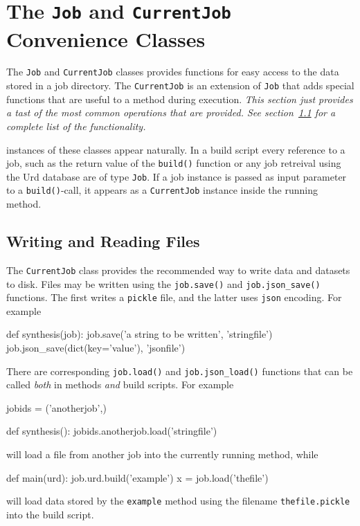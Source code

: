 \section{The \texttt{Job} and \texttt{CurrentJob} Convenience Classes}
The \texttt{Job} and \texttt{CurrentJob} classes provides functions
for easy access to the data stored in a job directory.  The
\texttt{CurrentJob} is an extension of \texttt{Job} that adds special
functions that are useful to a method during execution.  \textsl{This
  section just provides a tast of the most common operations that are
  provided.  See section~\ref{} for a complete list of the
  functionality.}

instances of these classes appear naturally.  In a build script every
reference to a job, such as the return value of the \texttt{build()}
function or any job retreival using the Urd database are of type
\texttt{Job}.  If a job instance is passed as input parameter to a
\texttt{build()}-call, it appears as a \texttt{CurrentJob} instance
inside the running method.


\subsection{Writing and Reading Files}
The \texttt{CurrentJob} class provides the recommended way to write
data and datasets to disk.  Files may be written using the
\texttt{job.save()} and \texttt{job.json\_save()} functions.  The
first writes a \texttt{pickle} file, and the latter uses \texttt{json}
encoding.  For example
\begin{python}
def synthesis(job):
   job.save('a string to be written', 'stringfile')
   job.json_save(dict(key='value'), 'jsonfile')
\end{python}
There are corresponding \texttt{job.load()} and
\texttt{job.json\_load()} functions that can be called \textsl{both}
in methods \textsl{and} build scripts.  For example
\begin{python}
jobids = ('anotherjob',)

def synthesis():
    jobids.anotherjob.load('stringfile')
\end{python}
will load a file from another job into the currently running method, while
\begin{python}
def main(urd):
    job.urd.build('example')
    x = job.load('thefile')
\end{python}
will load data stored by the \texttt{example} method using the
filename \texttt{thefile.pickle} into the build script.


